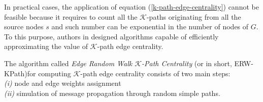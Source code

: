 {In practical cases, the application of equation (\ref{k-path-edge-centrality}) cannot be feasible because it requires to count all the $\mathcal{K}$-paths originating from all the source nodes $s$ and such number can be exponential in the number of nodes of $G$. To this purpose, authors in \cite{ref-35} designed algorithms capable of efficiently approximating the value of $\mathcal{K}$-path edge centrality.

The algorithm called \textit{Edge Random Walk $\mathcal{K}$-Path Centrality} (or in short, ERW-KPath)for computing $\mathcal{K}$-path edge centrality consists of two main steps:\\ \textit{(i)} node and edge weights assignment\\ 
\textit{(ii)} simulation of message propagation through random simple paths.

}
